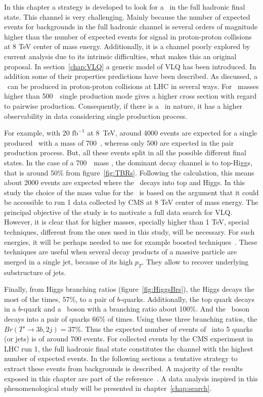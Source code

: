 In this chapter a strategy is developed to look for a \Tp~in the full hadronic final state. This channel is very challenging. Mainly because the number of expected events for backgrounds in the full hadronic channel is several orders of magnitude higher than the number of expected events for signal in proton-proton collisions at 8 TeV center of mass energy. Additionally, it is a channel poorly explored by current analysis due to its intrinsic difficulties, what makes this an original proposal. In section~\ref{chap:VLQ} a generic model of VLQ has been introduced. In addition some of their properties predictions have been described. As discussed, a \Tp~can be produced in proton-proton collisions at LHC in several ways. For \Tp~masses higher than 500~\GeVcc~single production mode gives a higher cross section with regard to pairwise production. Consequently, if there is a \Tp~in nature, it has a higher observability in data considering single production process. 

For example, with 20 $\text{fb}^{-1}$ at 8~TeV, around 4000 events are expected for a single produced \Tp~with a mass of 700~\GeVcc, whereas only 500 are expected in the pair production process. But, all these events split in all the possible different final states. In the case of a 700~\GeVcc~mass \Tp , the dominant decay channel is to top-Higgs, that is around 50\% from figure~\ref{fig:TBRs}. Following the calculation, this means about 2000 events are expected where the \Tp~decays into top and Higgs. In this study the choice of the mass value for the \Tp~is based on the argument that it could be accessible to run 1 data collected by CMS at 8 TeV center of mass energy. The principal objective of the study is to motivate a full data search for VLQ. However, it is clear that for higher masses, specially higher than 1 TeV, special techniques, different from the ones used in this study, will be necessary. For such energies, it will be perhaps needed to use for example boosted techniques~\cite{CMS:2013vca, ATLAS-CONF-2013-084, Usai:2015vva}. These techniques are useful when several decay products of a massive particle are merged in a single jet, because of its high $p_{T}$. They allow to recover underlying substructure of jets.

Finally, from Higgs branching ratios (figure~\ref{fig:HiggsBrs}), the Higgs decays the most of the times, 57\%, to a pair of $b$-quarks. Additionally, the top quark decays in a $b$-quark and a \W~boson with a branching ratio about 100\%. And the \W~boson decays into a pair of quarks 66\% of times. Using these three branching ratios, the $Br(T'\to 3b, 2j)=37$\%. Thus the expected number of events of \Tp~into 5 quarks (or jets) is of around 700 events. For collected events by the CMS experiment in LHC run 1, the full hadronic final state constitutes the channel with the highest number of expected events. In the following sections a tentative strategy to extract these events from backgrounds is described. A majority of the results exposed in this chapter are part of the reference~\cite{Beauceron:2014ila}. A data analysis inspired in this phenomenological study will be presented in chapter~\ref{chap:search}. %

